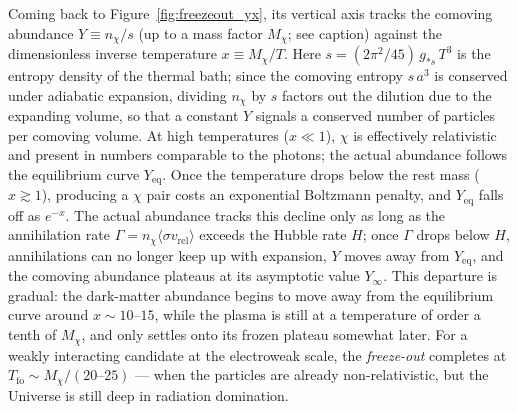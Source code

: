 Coming back to Figure~\ref{fig:freezeout_yx}, its vertical axis tracks the comoving abundance $Y \equiv n_\chi/s$ (up to a mass factor $M_\chi$; see caption) against the dimensionless inverse temperature $x \equiv M_\chi/T$.
Here $s = (2\pi^2/45)\, g_{*s}\, T^3$ is the entropy density of the thermal bath; since the comoving entropy $s\,a^3$ is conserved under adiabatic expansion, dividing $n_\chi$ by $s$ factors out the dilution due to the expanding volume, so that a constant $Y$ signals a conserved number of particles per comoving volume.
At high temperatures ($x \ll 1$), $\chi$ is effectively relativistic and present in numbers comparable to the photons; the actual abundance follows the equilibrium curve $Y_\mathrm{eq}$.
Once the temperature drops below the rest mass ($x \gtrsim 1$), producing a $\chi$ pair costs an exponential Boltzmann penalty, and $Y_\mathrm{eq}$ falls off as $e^{-x}$.
The actual abundance tracks this decline only as long as the annihilation rate $\Gamma = n_\chi \langle \sigma v_\mathrm{rel}\rangle$ exceeds the Hubble rate $H$; once $\Gamma$ drops below $H$, annihilations can no longer keep up with expansion, $Y$ moves away from $Y_\mathrm{eq}$, and the comoving abundance plateaus at its asymptotic value $Y_\infty$.
This departure is gradual: the dark-matter abundance begins to move away from the equilibrium curve around $x \sim 10$--$15$, while the plasma is still at a temperature of order a tenth of $M_\chi$, and only settles onto its frozen plateau somewhat later.
For a weakly interacting candidate at the electroweak scale, the \emph{freeze-out} completes at $T_\mathrm{fo} \sim M_\chi/(20\text{--}25)$ --- when the particles are already non-relativistic, but the Universe is still deep in radiation domination.

